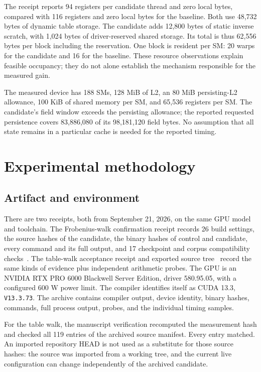\documentclass[11pt,a4paper]{article}
\newcommand{\code}[1]{\texttt{\small #1}}
\begin{document}
The receipt reports 94 registers per candidate thread and zero local bytes, compared with 116 registers and zero local bytes for the baseline. Both use 48,732 bytes of dynamic table storage. The candidate adds 12,800 bytes of static inverse scratch, with 1,024 bytes of driver-reserved shared storage. Its total is thus 62,556 bytes per block including the reservation. One block is resident per SM: 20 warps for the candidate and 16 for the baseline. These resource observations explain feasible occupancy; they do not alone establish the mechanism responsible for the measured gain.

The measured device has 188 SMs, 128 MiB of L2, an 80 MiB persisting-L2 allowance, 100 KiB of shared memory per SM, and 65,536 registers per SM. The candidate's field window exceeds the persisting allowance; the reported requested persistence covers 83,886,080 of its 98,181,120 field bytes. No assumption that all state remains in a particular cache is needed for the reported timing.

\section{Experimental methodology}\label{sec:methodology}
\subsection{Artifact and environment}
There are two receipts, both from September 21, 2026, on the same GPU model and toolchain. The Frobenius-walk confirmation receipt records 26 build settings, the source hashes of the candidate, the binary hashes of control and candidate, every command and its full output, and 17 checkpoint and corpus compatibility checks~\cite{sigmareceipt}. The table-walk acceptance receipt and exported source tree~\cite{artifact} record the same kinds of evidence plus independent arithmetic probes. The GPU is an NVIDIA RTX PRO 6000 Blackwell Server Edition, driver 580.95.05, with a configured 600 W power limit. The compiler identifies itself as CUDA 13.3, \code{V13.3.73}. The archive contains compiler output, device identity, binary hashes, commands, full process output, probes, and the individual timing samples.

For the table walk, the manuscript verification recomputed the measurement hash and checked all 119 entries of the archived source manifest. Every entry matched. An imported repository HEAD is not used as a substitute for those source hashes: the source was imported from a working tree, and the current live configuration can change independently of the archived candidate.
\end{document}
